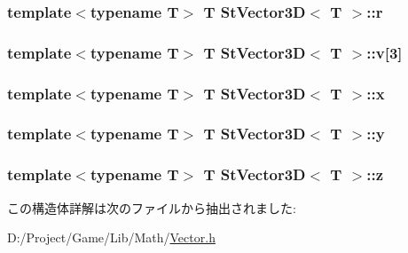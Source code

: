 \subsubsection[{r}]{\setlength{\rightskip}{0pt plus 5cm}template$<$typename T$>$ T {\bf St\+Vector3\+D}$<$ T $>$\+::r}\label{struct_st_vector3_d_a89a320b15b55906565a8bf6c3c3cfc8a}
\hypertarget{struct_st_vector3_d_abcad16bb72da516250165e2a46d29f17}{}
\subsubsection[{v}]{\setlength{\rightskip}{0pt plus 5cm}template$<$typename T$>$ T {\bf St\+Vector3\+D}$<$ T $>$\+::v\mbox{[}3\mbox{]}}\label{struct_st_vector3_d_abcad16bb72da516250165e2a46d29f17}
\hypertarget{struct_st_vector3_d_ac08f070b42a09572a3734c3dc1fca5d4}{}
\subsubsection[{x}]{\setlength{\rightskip}{0pt plus 5cm}template$<$typename T$>$ T {\bf St\+Vector3\+D}$<$ T $>$\+::x}\label{struct_st_vector3_d_ac08f070b42a09572a3734c3dc1fca5d4}
\hypertarget{struct_st_vector3_d_a74be4b7194542c2f32253527a740cb7c}{}
\subsubsection[{y}]{\setlength{\rightskip}{0pt plus 5cm}template$<$typename T$>$ T {\bf St\+Vector3\+D}$<$ T $>$\+::y}\label{struct_st_vector3_d_a74be4b7194542c2f32253527a740cb7c}
\hypertarget{struct_st_vector3_d_a11281d3c31dddad00b05b8d1e310af53}{}
\subsubsection[{z}]{\setlength{\rightskip}{0pt plus 5cm}template$<$typename T$>$ T {\bf St\+Vector3\+D}$<$ T $>$\+::z}\label{struct_st_vector3_d_a11281d3c31dddad00b05b8d1e310af53}


この構造体詳解は次のファイルから抽出されました\+:\begin{DoxyCompactItemize}
\item 
D\+:/\+Project/\+Game/\+Lib/\+Math/\hyperlink{_vector_8h}{Vector.\+h}\end{DoxyCompactItemize}
